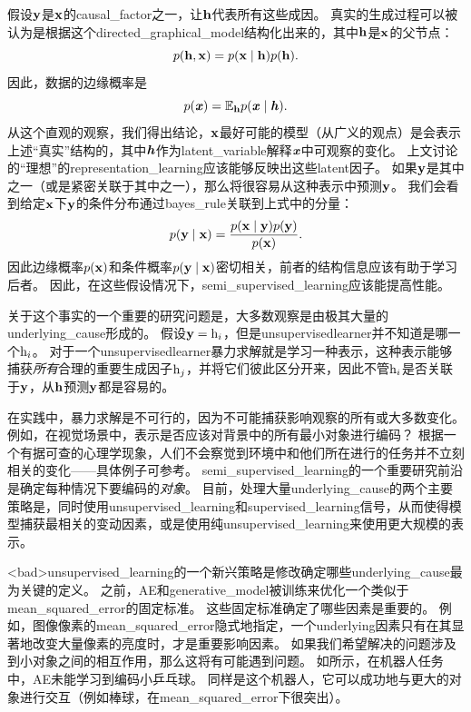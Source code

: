 假设$\mathbf{y}$是$\mathbf{x}$的\gls{causal_factor}之一，让$\mathbf{h}$代表所有这些成因。
真实的生成过程可以被认为是根据这个\gls{directed_graphical_model}结构化出来的，其中$\mathbf{h}$是$\mathbf{x}$的父节点：
\begin{equation}
	p(\mathbf{h}, \mathbf{x}) = p(\mathbf{x} \mid \mathbf{h}) p(\mathbf{h}).
\end{equation}
因此，数据的边缘概率是
\begin{equation}
	p(\boldsymbol{\mathit{x}}) = \mathbb{E}_{\mathbf{h}} p(\boldsymbol{\mathit{x}} \mid \boldsymbol{\mathit{h}}).
\end{equation}
从这个直观的观察，我们得出结论，$\mathbf{x}$最好可能的模型（从广义的观点）是会表示上述``真实''结构的，其中$\boldsymbol{\mathit{h}}$作为\gls{latent_variable}解释$\boldsymbol{\mathit{x}}$中可观察的变化。
上文讨论的``理想''的\gls{representation_learning}应该能够反映出这些\gls{latent}因子。
如果$\mathbf{y}$是其中之一（或是紧密关联于其中之一），那么将很容易从这种表示中预测$\mathbf{y}$。
我们会看到给定$\mathbf{x}$下$\mathbf{y}$的条件分布通过\gls{bayes_rule}关联到上式中的分量：
\begin{equation}
	p(\mathbf{y} \mid \mathbf{x}) = \frac{ p(\mathbf{x} \mid \mathbf{y}) p(\mathbf{y}) }{p(\mathbf{x})}.
\end{equation}
因此边缘概率$p(\mathbf{x})$和条件概率$p(\mathbf{y} \mid \mathbf{x})$密切相关，前者的结构信息应该有助于学习后者。
因此，在这些假设情况下，\gls{semi_supervised_learning}应该能提高性能。

关于这个事实的一个重要的研究问题是，大多数观察是由极其大量的\gls{underlying_cause}形成的。
假设$\mathbf{y} = \mathrm{h}_i$，但是\gls{unsupervised}\gls{learner}并不知道是哪一个$\mathrm{h}_i$。
对于一个\gls{unsupervised}\gls{learner}暴力求解就是学习一种表示，这种表示能够捕获\emph{所有}合理的重要生成因子$\mathrm{h}_j$，并将它们彼此区分开来，因此不管$\mathrm{h}_i$是否关联于$\mathbf{y}$，从$\mathbf{h}$预测$\mathbf{y}$都是容易的。


在实践中，暴力求解是不可行的，因为不可能捕获影响观察的所有或大多数变化。
例如，在视觉场景中，表示是否应该对背景中的所有最小对象进行编码？
根据一个有据可查的心理学现象，人们不会察觉到环境中和他们所在进行的任务并不立刻相关的变化——具体例子可参考\cite{simons1998failure}。
\gls{semi_supervised_learning}的一个重要研究前沿是确定每种情况下要编码的\emph{对象}。
目前，处理大量\gls{underlying_cause}的两个主要策略是，同时使用\gls{unsupervised_learning}和\gls{supervised_learning}信号，从而使得模型捕获最相关的变动因素，或是使用纯\gls{unsupervised_learning}来使用更大规模的表示。

<bad>\gls{unsupervised_learning}的一个新兴策略是修改确定哪些\gls{underlying_cause}最为关键的定义。%
之前，\gls{AE}和\gls{generative_model}被训练来优化一个类似于\gls{mean_squared_error}的固定标准。
这些固定标准确定了哪些因素是重要的。
例如，图像像素的\gls{mean_squared_error}隐式地指定，一个\gls{underlying}因素只有在其显著地改变大量像素的亮度时，才是重要影响因素。
如果我们希望解决的问题涉及到小对象之间的相互作用，那么这将有可能遇到问题。
如所示，在机器人任务中，\gls{AE}未能学习到编码小乒乓球。
同样是这个机器人，它可以成功地与更大的对象进行交互（例如棒球，在\gls{mean_squared_error}下很突出）。


